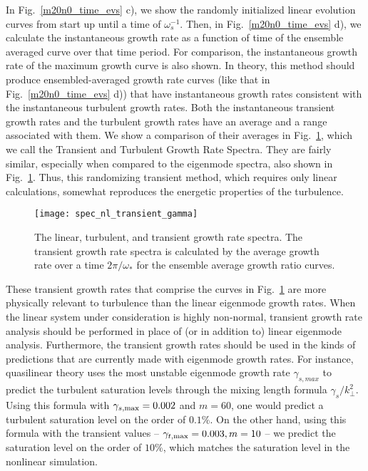 \documentclass[showpacs,preprintnumbers,amsmath,amssymb,superscriptaddress,aip]{revtex4-1}
\begin{document}
In Fig.~\ref{m20n0_time_evs} c), we show the randomly initialized linear evolution curves from start up until a time of $\omega_s^{-1}$. 
Then, in Fig.~\ref{m20n0_time_evs} d), we calculate the instantaneous growth rate as a function of time of the ensemble averaged curve over that time period. 
For comparison, the instantaneous growth rate of the maximum growth curve is also shown.
In theory, this method should produce ensembled-averaged growth rate curves (like that in Fig.~\ref{m20n0_time_evs} d)) that have instantaneous growth rates consistent with the instantaneous
turbulent growth rates. Both the instantaneous transient growth rates and the turbulent growth rates have an average and a range associated with them. We show a comparison of their averages
in Fig.~\ref{spec_nl_transient_gamma}, which we call the Transient and Turbulent Growth Rate Spectra. They are fairly similar, especially when compared to the eigenmode spectra, also
shown in Fig.~\ref{spec_nl_transient_gamma}. Thus, this randomizing transient method, which requires only linear calculations, somewhat reproduces the energetic properties of the turbulence.

\begin{figure}
\centerline{\texttt{[image: spec\_nl\_transient\_gamma]}}
\caption{The linear, turbulent, and transient growth rate spectra. The transient growth rate spectra is calculated by the average growth rate over a time $2 \pi / \omega_*$ for the ensemble average
growth ratio curves.}
\label{spec_nl_transient_gamma}
\end{figure}

These transient growth rates that comprise the curves in Fig.~\ref{spec_nl_transient_gamma} are more physically relevant to turbulence than the linear eigenmode growth rates. When the linear system under
consideration is highly non-normal, transient growth rate analysis should be performed in place of (or in addition to) linear eigenmode analysis. Furthermore, the transient growth rates should
be used in the kinds of predictions that are currently made with eigenmode growth rates. For instance, quasilinear theory uses the most unstable eigenmode growth rate $\gamma_{s,max}$ 
to predict the turbulent saturation levels through the mixing length formula $\gamma_s/k_\perp^2$. Using this formula with $\gamma_{s,\rm{max}} = 0.002$ and $m=60$, one would predict a turbulent saturation
level on the order of $0.1 \%$. On the other hand, using this formula with the transient values -- $\gamma_{t,\rm{max}} = 0.003, m=10$ -- we predict the saturation level on the order of $10 \%$,
which matches the saturation level in the nonlinear simulation.

\begin{acknowledgments}

\end{acknowledgments}





%
\end{document}

